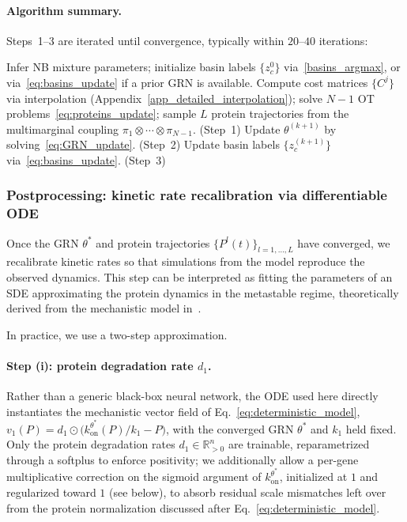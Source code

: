 \documentclass[a4paper, 11pt]{article}
\theoremstyle{plain}
\theoremstyle{remark}
\newcommand*{\firstreview}[1]{{\color{black}#1}}
\begin{document}
\paragraph{Algorithm summary.}
Steps~1--3 are iterated until convergence, typically within $20$--$40$ iterations:

\begin{algorithm}[H]
\caption{CardamomOT}
\begin{algorithmic}[1]
\State Infer NB mixture parameters; initialize basin labels $\{z_c^0\}$ via~\eqref{basins_argmax}, or via~\eqref{eq:basins_update} if a prior GRN is available.
  \State Compute cost matrices $\{C^j\}$ via interpolation (Appendix~\ref{app_detailed_interpolation}); solve \firstreview{$N-1$} OT problems~\eqref{eq:proteins_update}; sample $L$ protein trajectories from the multimarginal coupling $\pi_1\otimes\cdots\otimes\pi_{N-1}$. \hfill (Step~1)
  \State Update $\theta^{(k+1)}$ by solving~\eqref{eq:GRN_update}. \hfill (Step~2)
  \State Update basin labels $\{z_c^{(k+1)}\}$ via~\eqref{eq:basins_update}. \hfill (Step~3)
\EndFor
\end{algorithmic}
\end{algorithm}

\subsubsection{Postprocessing: kinetic rate recalibration via differentiable ODE}
\label{subsec:postproc}

Once the GRN $\theta^*$ and protein trajectories $\{P^l(t)\}_{l=1,\dots,L}$ have converged, we recalibrate kinetic rates so that simulations from the model reproduce the observed dynamics. This step can be interpreted as fitting the parameters of an SDE approximating the protein dynamics in the metastable regime, theoretically derived from the mechanistic model in~\cite{ventre2020reduction}.

In practice, we use a two-step approximation.

\paragraph{Step (i): protein degradation rate $d_1$.}
\firstreview{Rather than a generic black-box neural network, the ODE used here directly instantiates the mechanistic vector field of Eq.~\eqref{eq:deterministic_model}, $v_1(P)=d_1\odot\big(k_{\mathrm{on}}^{\theta^*}(P)/k_1-P\big)$, with the converged GRN $\theta^*$ and $k_1$ held fixed. Only the protein degradation rates $d_1\in\mathbb{R}^n_{>0}$ are trainable, reparametrized through a softplus to enforce positivity; we additionally allow a per-gene multiplicative correction on the sigmoid argument of $k_{\mathrm{on}}^{\theta^*}$, initialized at $1$ and regularized toward $1$ (see below), to absorb residual scale mismatches left over from the protein normalization discussed after Eq.~\eqref{eq:deterministic_model}.}
\end{document}
